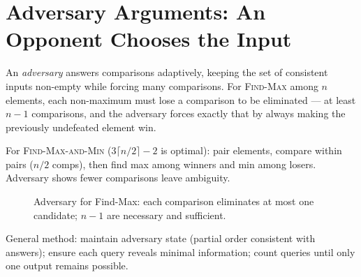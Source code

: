 \section{Adversary Arguments: An Opponent Chooses the Input}
\label{sec:adversary}

An \emph{adversary} answers comparisons adaptively, keeping the set of consistent inputs non-empty while forcing many comparisons. For \textsc{Find-Max} among $n$ elements, each non-maximum must lose a comparison to be eliminated --- at least $n-1$ comparisons, and the adversary forces exactly that by always making the previously undefeated element win.

For \textsc{Find-Max-and-Min} ($3\lceil n/2\rceil-2$ is optimal): pair elements, compare within pairs ($n/2$ comps), then find max among winners and min among losers. Adversary shows fewer comparisons leave ambiguity.

\begin{figure}[h]\centering
{}
\caption{Adversary for Find-Max: each comparison eliminates at most one candidate; $n-1$ are necessary and sufficient.}
\label{fig:adversary}
\end{figure}

General method: maintain adversary state (partial order consistent with answers); ensure each query reveals minimal information; count queries until only one output remains possible.

